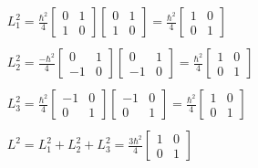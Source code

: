\begin{equation}
  \label{9.49}
  \begin{array}{c}
  L_1^2 = \frac{\hbar^2}{4}
  \left[
  \begin{matrix}
    0 & 1\\
    1 & 0
  \end{matrix}\right]
  \left[
    \begin{matrix}
      0 & 1\\
      1 & 0
    \end{matrix}\right] =
  \frac{\hbar^2}{4} \left[\begin{matrix}
  1 & 0\\
  0 & 1
  \end{matrix}
  \right]
  \\

  \\
  L_2^2 = \frac{-\hbar^2}{4} \left[
    \begin{matrix}
      0 & 1\\
      -1 & 0
    \end{matrix}\right]\left[\begin{matrix}
      0 & 1\\
      -1 & 0
    \end{matrix}
  \right] =
  \frac{\hbar^2}{4} \left[
    \begin{matrix}
      1 & 0\\
      0 & 1
    \end{matrix}
  \right]
  \\

  \\
  L_3^2 = \frac{\hbar^2}{4}
  \left[\begin{matrix}
    -1 & 0\\
    0 & 1
  \end{matrix}\right]\left[\begin{matrix}
    -1 & 0\\
    0 & 1
  \end{matrix}\right] =
  \frac{\hbar^2}{4}
  \left[\begin{matrix}
    1 & 0\\
    0 & 1
  \end{matrix}\right]
  \\

  \\
  L^2 = L_1^2 + L_2^2 + L_3^2 = \frac{3\hbar^2}{4}\left[\begin{matrix}
    1 & 0\\
    0 & 1
  \end{matrix}\right]
  \end{array}
\end{equation}

